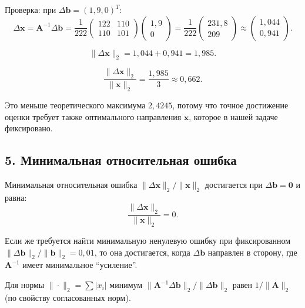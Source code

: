 \documentclass{article}
\begin{document}
Проверка: при $\Delta\mathbf{b} = (1{,}9, 0)^T$:
\begin{equation}
\Delta\mathbf{x} = \mathbf{A}^{-1}\Delta\mathbf{b} = \frac{1}{222} \begin{pmatrix} 122 & 110 \\ 110 & 101 \end{pmatrix} \begin{pmatrix} 1{,}9 \\ 0 \end{pmatrix} = \frac{1}{222} \begin{pmatrix} 231{,}8 \\ 209 \end{pmatrix} \approx \begin{pmatrix} 1{,}044 \\ 0{,}941 \end{pmatrix}.
\end{equation}

\begin{equation}
\|\Delta\mathbf{x}\|_2 = 1{,}044 + 0{,}941 = 1{,}985.
\end{equation}

\begin{equation}
\frac{\|\Delta\mathbf{x}\|_2}{\|\mathbf{x}\|_2} = \frac{1{,}985}{3} \approx 0{,}662.
\end{equation}

Это меньше теоретического максимума $2{,}4245$, потому что точное достижение оценки требует также оптимального направления $\mathbf{x}$, которое в нашей задаче фиксировано.

\subsection*{5. Минимальная относительная ошибка}

Минимальная относительная ошибка $\|\Delta\mathbf{x}\|_2/\|\mathbf{x}\|_2$ достигается при $\Delta\mathbf{b} = \mathbf{0}$ и равна:
\begin{equation}
\boxed{\frac{\|\Delta\mathbf{x}\|_2}{\|\mathbf{x}\|_2} = 0.}
\end{equation}

Если же требуется найти минимальную ненулевую ошибку при фиксированном $\|\Delta\mathbf{b}\|_2/\|\mathbf{b}\|_2 = 0{,}01$, то она достигается, когда $\Delta\mathbf{b}$ направлен в сторону, где $\mathbf{A}^{-1}$ имеет минимальное ``усиление''.

Для нормы $\|\cdot\|_2 = \sum |x_i|$ минимум $\|\mathbf{A}^{-1}\Delta\mathbf{b}\|_2/\|\Delta\mathbf{b}\|_2$ равен $1/\|\mathbf{A}\|_2$ (по свойству согласованных норм).
\end{document}
